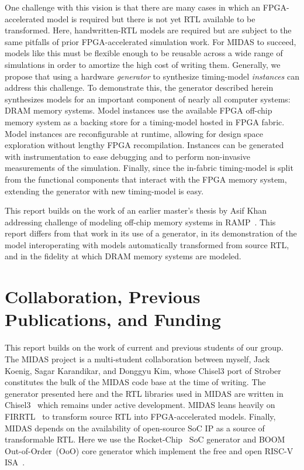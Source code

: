 One challenge with this vision is that there are many cases in which an
FPGA-accelerated model is required but there is not yet RTL available to be
transformed. Here, handwritten-RTL models are required but are subject to the same
pitfalls of prior FPGA-accelerated simulation work. For MIDAS to
succeed, models like this must be flexible enough to be reusable across a wide
range of simulations in order to amortize the high cost of writing them.
Generally, we propose that using a hardware \emph{generator} to synthesize
timing-model \emph{instances} can address this challenge. To demonstrate this, the
generator described herein synthesizes models for an important component of
nearly all computer systems: DRAM memory systems. Model instances use the
available FPGA off-chip memory system as a backing store for a timing-model
hosted in FPGA fabric. Model instances are reconfigurable at runtime, allowing for
design space exploration without lengthy FPGA recompilation. Instances can be
generated with instrumentation to ease debugging and to perform non-invasive
measurements of the simulation. Finally, since the in-fabric timing-model is
split from the functional components that interact with the FPGA memory system,
extending the generator with new timing-model is easy.

This report builds on the work of an earlier master's thesis by Asif
Khan~\cite{khanmasters} addressing challenge of modeling off-chip memory
systems in RAMP~\cite{ramp}. This report differs from that work in its use of
a generator, in its demonstration of the model interoperating with models
automatically transformed from source RTL, and in the fidelity at which
DRAM memory systems are modeled.

\section{Collaboration, Previous Publications, and Funding}

This report builds on the work of current and previous students of our group.
The MIDAS project is a multi-student collaboration between myself, Jack Koenig,
Sagar Karandikar, and Donggyu Kim, whose Chisel3 port of Strober~\cite{strober}
constitutes the bulk of the MIDAS code base at the time of writing. The
generator presented here and the RTL libraries used in MIDAS are written in
Chisel3~\cite{chisel} which remains under active development. MIDAS leans
heavily on FIRRTL~\cite{firrtl} to transform source RTL into FPGA-accelerated
models.  Finally, MIDAS depends on the availability of open-source SoC IP as a
source of transformable RTL. Here we use the Rocket-Chip~\cite{rocketchip} SoC
generator and BOOM~\cite{boom} Out-of-Order~(OoO) core generator which
implement the free and open RISC-V ISA~\cite{riscv}.


